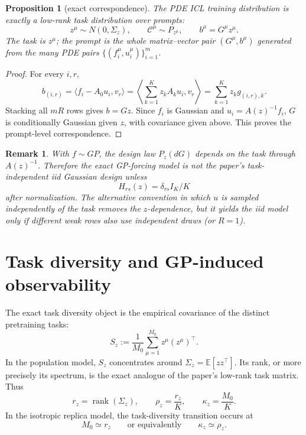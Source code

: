 \documentclass[11pt,a4paper]{article}
\newtheorem{proposition}{Proposition}
\newtheorem{remark}{Remark}
\theoremstyle{definition}
\newcommand{\E}{\mathbb E}
\newcommand{\calC}{\mathcal C}
\begin{document}
\begin{proposition}[exact correspondence]
\label{prop:exactcorrespondence}
The PDE ICL training distribution is exactly a low-rank task distribution over
prompts:
\[
    z^\mu\sim N(0,\Sigma_z),
    \qquad
    \calC^\mu\sim P_{z^\mu},
    \qquad
    b^\mu=G^\mu z^\mu .
\]
The task is $z^\mu$; the prompt is the whole matrix--vector pair
$(G^\mu,b^\mu)$ generated from the many PDE pairs
$\{(f_i^\mu,u_i^\mu)\}_{i=1}^{m}$.
\end{proposition}

\begin{proof}
For every $i,r$,
\[
    b_{(i,r)}
    =
    \langle f_i-A_0u_i,v_r\rangle
    =
    \left\langle
    \sum_{k=1}^K z_k A_ku_i,
    v_r
    \right\rangle
    =
    \sum_{k=1}^K z_k g_{(i,r),k}.
\]
Stacking all $mR$ rows gives $b=Gz$.  Since $f_i$ is Gaussian and
$u_i=A(z)^{-1}f_i$, $G$ is conditionally Gaussian given $z$, with covariance
given above.  This proves the prompt-level correspondence.
\end{proof}

\begin{remark}
With $f\sim GP$, the design law $P_z(dG)$ depends on the task through
$A(z)^{-1}$.  Therefore the exact GP-forcing model is not the paper's
task-independent iid Gaussian design unless
\[
 H_{rs}(z)=\delta_{rs}I_K/K
\]
after normalization. The alternative convention in which \(u\) is sampled
independently of the task removes the \(z\)-dependence, but it yields the iid
model only if different weak rows also use independent draws (or \(R=1\)).
\end{remark}

\section{Task diversity and GP-induced observability}

The exact task diversity object is the empirical covariance of the distinct
pretraining tasks:
\[
    S_z
    :=
    \frac1{M_0}\sum_{\mu=1}^{M_0}z^\mu(z^\mu)^\top .
\]
In the population model, $S_z$ concentrates around
$\Sigma_z=\E[zz^\top]$.  Its rank, or more precisely its spectrum, is the exact
analogue of the paper's low-rank task matrix.  Thus
\[
    r_z=\operatorname{rank}(\Sigma_z),
    \qquad
    \rho_z=\frac{r_z}{K},
    \qquad
    \kappa_z=\frac{M_0}{K}.
\]
In the isotropic replica model, the task-diversity transition occurs at
\[
    M_0\simeq r_z
    \qquad
    \text{or equivalently}
    \qquad
    \kappa_z\simeq\rho_z .
\]
\end{document}
